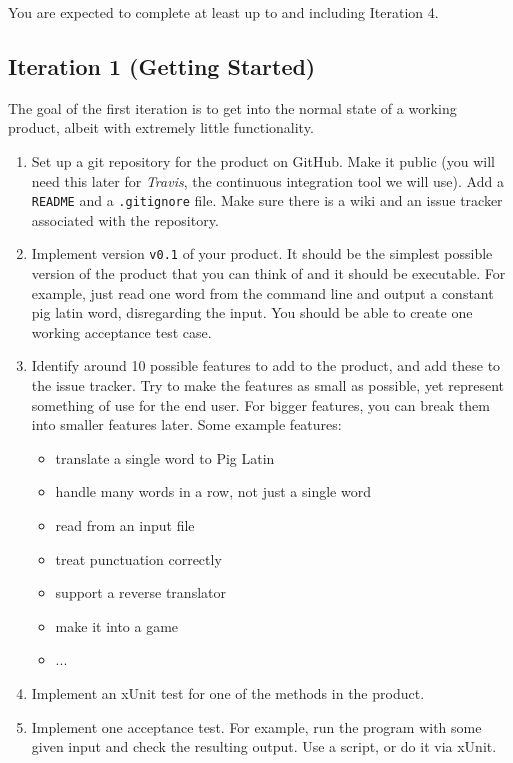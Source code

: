 \documentclass[swedish,english]{article}
\begin{document}
You are expected to complete at least up to and including Iteration 4.

\subsection*{Iteration 1 (Getting Started)}
The goal of the first iteration is to get into the normal state of a working product, albeit with extremely little functionality.

\begin{enumerate}

\item Set up a git repository for the product on GitHub. Make it public (you will need this later for \emph{Travis}, the continuous integration tool we will use). Add a \verb'README' and a \verb'.gitignore' file. Make sure there is a wiki and an issue tracker associated with the repository.

\item Implement version \verb'v0.1' of your product. It should be the simplest possible version of the product that you can think of and it should be executable. For example, just read one word from the command line and output a constant pig latin word, disregarding the input. You should be able to create one working acceptance test case.

\item Identify around 10 possible features to add to the product, and add these to the issue tracker. Try to make the features as small as possible, yet represent something of use for the end user. For bigger features, you can break them into smaller features later. Some example features:
\begin{itemize}
\item translate a single word to Pig Latin
\item handle many words in a row, not just a single word
\item read from an input file
\item treat punctuation correctly
\item support a reverse translator
\item make it into a game
\item ...
\end{itemize}

\item Implement an xUnit test for one of the methods in the  product.

\item Implement one acceptance test. For example, run the program with some given input and check the resulting output. Use a script, or do it via xUnit.


\end{enumerate}
\end{document}
